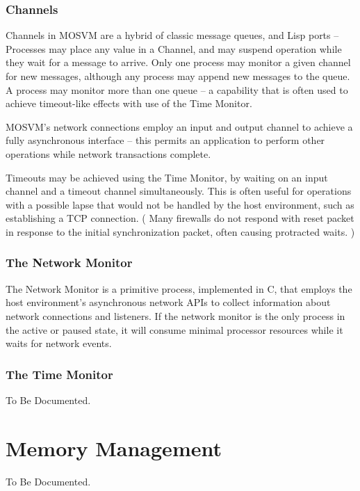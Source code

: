 \documentclass[notitlepage,oneside]{book}
\begin{document}
\subsection{Channels}

Channels in MOSVM are a hybrid of classic message queues, and Lisp ports -- Processes may place any value in a Channel, and may suspend operation while they wait for a message to arrive.  Only one process may monitor a given channel for new messages, although any process may append new messages to the queue.  A process may monitor more than one queue -- a capability that is often used to achieve timeout-like effects with use of the Time Monitor.

MOSVM's network connections employ an input and output channel to achieve a fully asynchronous interface -- this permits an application to perform other operations while network transactions complete.

Timeouts may be achieved using the Time Monitor, by waiting on an input channel and a timeout channel simultaneously.  This is often useful for operations with a possible lapse that would not be handled by the host environment, such as establishing a TCP connection.  ( Many firewalls do not respond with reset packet in response to the initial synchronization packet, often causing protracted waits. )

\subsection{The Network Monitor}

The Network Monitor is a primitive process, implemented in C, that employs the host environment's asynchronous network APIs to collect information about network connections and listeners.  If the network monitor is the only process in the active or paused state, it will consume minimal processor resources while it waits for network events.

\subsection{The Time Monitor}

To Be Documented.

\chapter{Memory Management}
\label{memory}

To Be Documented.
\end{document}
